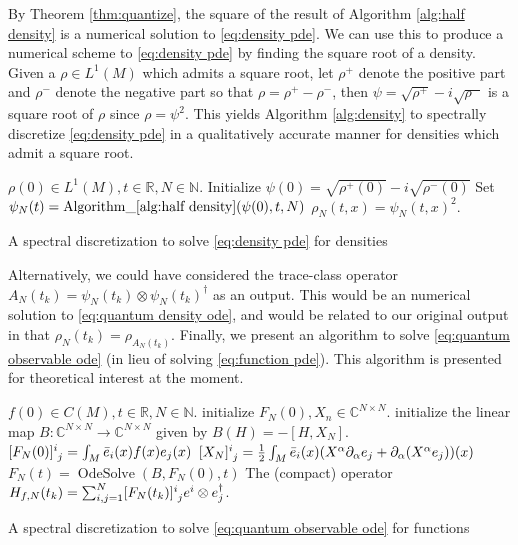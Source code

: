 \documentclass[final,leqno]{siamart}
\DeclareMathOperator{\OdeSolve}{OdeSolve}
\begin{document}
By Theorem \ref{thm:quantize}, the square of the result of Algorithm \ref{alg:half density} is a numerical solution to \eqref{eq:density pde}.
We can use this to produce a numerical scheme to \eqref{eq:density pde} by finding the square root of a density.
Given a $\rho \in L^1(M)$ which admits a square root, let $\rho^{+}$ denote the positive part and $\rho^{-}$ denote the negative part so that $\rho = \rho^{+} - \rho^{-}$, 
then $\psi = \sqrt{\rho^{+}} - i \sqrt{\rho^{-}}$ is a square root of $\rho$ since $\rho = \psi^{2}$.
This yields Algorithm \ref{alg:density} to spectrally discretize \eqref{eq:density pde} in a qualitatively accurate manner for densities which admit a square root.

\begin{algorithm}
\begin{algorithmic}
	\REQUIRE $\rho(0) \in L^{1}(M), t \in \mathbb{R},N \in \mathbb{N}$.
	\STATE	Initialize $\psi(0) =  \sqrt{\rho^{+}(0)} - i \sqrt{\rho^{-}(0)}$
	\STATE	Set $\psi_{N}(t) =  \operatorname{ Algorithm\_ \ref{alg:half density} }( \psi(0) , t, N )$
	\RETURN $\rho_{N}(t , x) = \psi_{N}(t , x)^{2}$.
\end{algorithmic}
	\caption{A spectral discretization to solve \eqref{eq:density pde} for densities} \label{alg:density}
\end{algorithm}

Alternatively, we could have considered the trace-class operator $A_{N}(t_{k}) = \psi_{N}(t_{k}) \otimes \psi_{N}(t_{k})^{\dagger}$ as an output. 
This would be an numerical solution to \eqref{eq:quantum density ode}, and would be related to our original output in that $\rho_{N}(t_{k}) = \rho_{A_{N}(t_{k})}$.
Finally, we present an algorithm to solve \eqref{eq:quantum observable ode} (in lieu of solving \eqref{eq:function pde}).
This algorithm is presented for theoretical interest at the moment.

\begin{algorithm}[H]
\begin{algorithmic}
	\REQUIRE $f(0) \in C(M), t \in \mathbb{R}, N \in \mathbb{N}$.
	\STATE initialize $F_{N}(0), X_{n} \in \mathbb{C}^{N \times N}$.
	\STATE initialize the linear map $B: \mathbb{C}^{N \times N} \to \mathbb{C}^{N \times N}$ given by $B(H) = - [H , X_{N}]$.
		\STATE $[F_{N}(0)]\indices{^i_{j}} =  \int_{M} \bar{e}_{i}(x) f(x) e_{j}(x)$ 
		\STATE $[X_{N}]\indices{^i_{j}} = \frac{1}{2} \int_{M} \bar{e}_{i}(x) ( X^{\alpha} \partial_{\alpha} e_{j} + \partial_{\alpha}( X^{\alpha} e_{j}) )(x)$ 
	\ENDFOR
	\STATE $F_{N}(t) = \OdeSolve( B , F_{N}(0) , t)$
	\RETURN The (compact) operator $H_{f,N}(t_{k}) = \sum_{i,j=1}^{N}[ F_{N}(t_{k}) ] \indices{^{i}_{j}} e^{i} \otimes e_{j}^{\dagger}$.
\end{algorithmic}
	\caption{A spectral discretization to solve \eqref{eq:quantum observable ode} for functions} \label{alg:function}
\end{algorithm}
\end{document}
